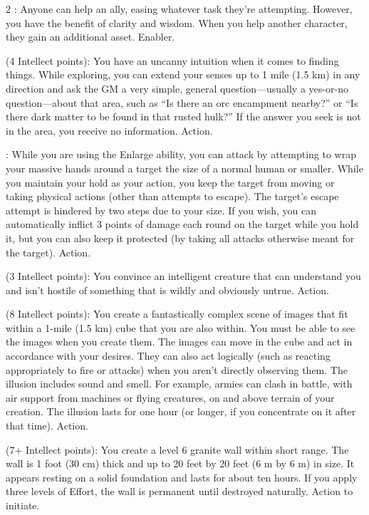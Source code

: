 \begin{multicols}{2}
: Anyone can help an ally, easing whatever task they’re attempting. However, you have the benefit of clarity and wisdom. When you help another character, they gain an additional asset. Enabler. 
 
 (4 Intellect points): You have an uncanny intuition when it comes to finding things. While exploring, you can extend your senses up to 1 mile (1.5 km) in any direction and ask the GM a very simple, general question—usually a yes-or-no question—about that area, such as “Is there an orc encampment nearby?” or “Is there dark matter to be found in that rusted hulk?” If the answer you seek is not in the area, you receive no information. Action. 
 
: While you are using the Enlarge ability, you can attack by attempting to wrap your massive hands around a target the size of a normal human or smaller. While you maintain your hold as your action, you keep the target from moving or taking physical actions (other than attempts to escape). The target’s escape attempt is hindered by two steps due to your size. If you wish, you can automatically inflict 3 points of damage each round on the target while you hold it, but you can also keep it protected (by taking all attacks otherwise meant for the target). Action. 
 
 (3 Intellect points): You convince an intelligent creature that can understand you and isn’t hostile of something that is wildly and obviously untrue. Action. 
 
 (8 Intellect points): You create a fantastically complex scene of images that fit within a 1-mile (1.5 km) cube that you are also within. You must be able to see the images when you create them. The images can move in the cube and act in accordance with your desires. They can also act logically (such as reacting appropriately to fire or attacks) when you aren’t directly observing them. The illusion includes sound and smell. For example, armies can clash in battle, with air support from machines or flying creatures, on and above terrain of your creation. The illusion lasts for one hour (or longer, if you concentrate on it after that time). Action. 
 
 (7+ Intellect points): You create a level 6 granite wall within short range. The wall is 1 foot (30 cm) thick and up to 20 feet by 20 feet (6 m by 6 m) in size. It appears resting on a solid foundation and lasts for about ten hours. If you apply three levels of Effort, the wall is permanent until destroyed naturally. Action to initiate. 
 

\end{multicols}
